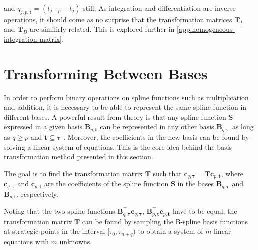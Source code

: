 and $q_{j,p,\mathbf{t}} = (t_{j+p}-t_j)$ still.
As integration and differentiation are inverse operations, it should come as no surprise that the transformation matrices $\mathbf T_I$ and $\mathbf T_D$ are similirly related. This is explored further in \cref{app:homogeneous-integration-matrix}.


\section{Transforming Between Bases}\label{sec:basis-transformation}
In order to perform binary operations on spline functions such as multiplication and addition, it is necessary to be able to represent the same spline function in different bases. A powerful result from theory is that any spline function $\mathbf S$ expressed in a given basis $\mathbf B_{p,\mathbf t}$ can be represented in any other basis $\mathbf B_{q,\boldsymbol \tau}$ as long as $q \geq p$ and $\mathbf t \subseteq \boldsymbol \tau$ \citep{Grimstad2016}. Moreover, the coefficients in the new basis can be found by solving a linear system of equations. This is the core idea behind the basis transformation method presented in this section.

The goal is to find the transformation matrix $\mathbf T$ such that $\mathbf c_{q, \boldsymbol \tau} = \mathbf T \mathbf c_{p, \mathbf t}$, where $\mathbf c_{q, \boldsymbol \tau}$ and $\mathbf c_{p, \mathbf t}$ are the coefficients of the spline function $\mathbf S$ in the bases $\mathbf B_{q,\boldsymbol \tau}$ and $\mathbf B_{p,\mathbf t}$, respectively.

Noting that the two spline functions $\mathbf B_{q,\boldsymbol \tau}^\top \mathbf c_{q, \boldsymbol \tau}$, $\mathbf B_{p,\mathbf t}^\top \mathbf c_{p, \mathbf t}$ have to be equal,
the transformation matrix $\mathbf T$ can be found by sampling the B-spline basis functions at strategic points in the interval $[\tau_0, \tau_{n+q})$ to obtain a system of $m$ linear equations with $m$ unknowns.

